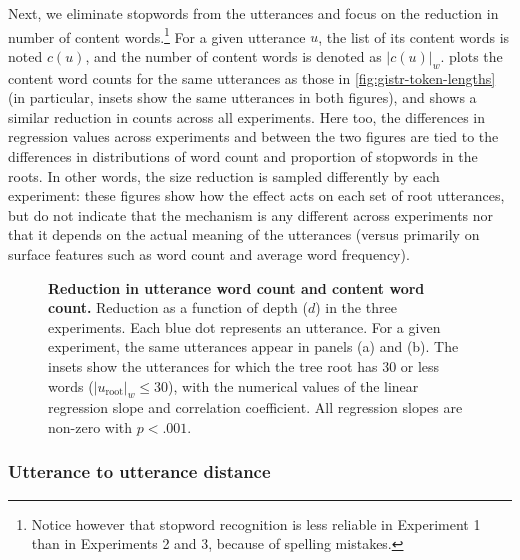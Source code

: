 \documentclass[a4paper,fleqn]{cas-dc}
\begin{document}
Next, we eliminate stopwords from the utterances and focus on the
reduction in number of content words.\footnote{Notice however that stopword
recognition is less reliable in Experiment 1 than in Experiments 2 and
3, because of spelling mistakes.} For a given utterance \(u\), the list
of its content words is noted \(c(u)\), and the number of content words
is denoted as \(|c(u)|_w\).%
 plots the content word counts for the
same utterances as those in \cref{fig:gistr-token-lengths} (in
particular, insets show the same utterances in both figures), and shows
a similar reduction in counts across all experiments. Here too, the
differences in regression values across experiments and between the two
figures are tied to the differences in distributions of word count and
proportion of stopwords in the roots. In other words, the size reduction
is sampled differently by each experiment: these figures show how the
effect acts on each set of root utterances, but do not indicate that the
mechanism is any different across experiments nor that it depends on the
actual meaning of the utterances (versus primarily on surface features
such as word count and average word frequency).

\begin{figure}
  \centering

  \caption[Reduction in utterance word count and content word count]{
  \textbf{Reduction in utterance word count and content word count.}
  Reduction as a function of depth ($d$) in the three experiments.
  Each blue dot represents an utterance.
  For a given experiment, the same utterances appear in panels (a) and (b).
  The insets show the utterances for which the tree root has 30 or less words ($|u_{\text{root}}|_w \leq 30$), with the numerical values of the linear regression slope and correlation coefficient.
  All regression slopes are non-zero with $p < .001$.
  }
  \label{fig:gistr-lengths}
\end{figure}

\subsubsection{Utterance to utterance
distance}\label{utterance-to-utterance-distance}
\end{document}
